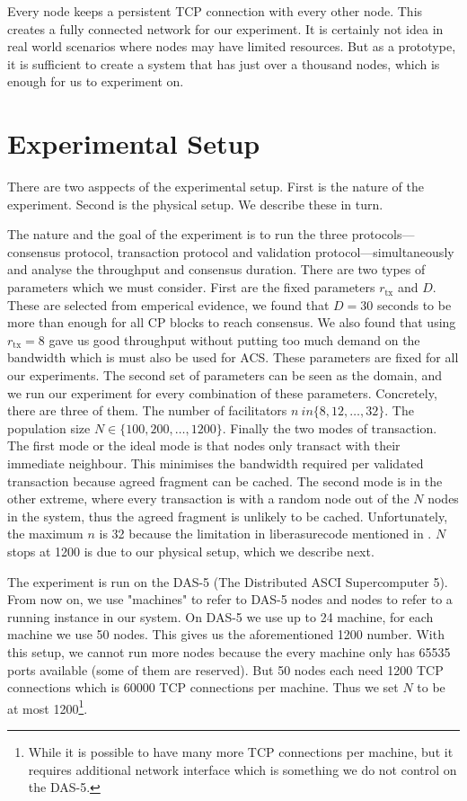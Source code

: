 Every node keeps a persistent TCP connection with every other node.
This creates a fully connected network for our experiment.
It is certainly not idea in real world scenarios where nodes may have limited resources.
But as a prototype, it is sufficient to create a system that has just over a thousand nodes, which is enough for us to experiment on.

\section{Experimental Setup}
\label{sec:experimental-setup}

There are two asppects of the experimental setup.
First is the nature of the experiment.
Second is the physical setup.
We describe these in turn.

The nature and the goal of the experiment is to run the three protocols---consensus protocol,
transaction protocol and validation protocol---simultaneously and analyse the throughput and consensus duration.
There are two types of parameters which we must consider.
First are the fixed parameters $r_{\text{tx}}$ and $D$.
These are selected from emperical evidence, we found that $D = 30$ seconds to be more than enough for all CP blocks to reach consensus.
We also found that using $r_{\text{tx}} = 8$ gave us good throughput without putting too much demand on the bandwidth which is must also be used for ACS.
These parameters are fixed for all our experiments.
The second set of parameters can be seen as the domain,
and we run our experiment for every combination of these parameters.
Concretely, there are three of them.
The number of facilitators $n \ in \{ 8, 12, \dots, 32\}$.
The population size $N \in \{100, 200, \dots, 1200\}$.
Finally the two modes of transaction.
The first mode or the ideal mode is that nodes only transact with their immediate neighbour. 
This minimises the bandwidth required per validated transaction because agreed fragment can be cached.
The second mode is in the other extreme, where  every transaction is with a random node out of the $N$ nodes in the system,
thus the agreed fragment is unlikely to be cached.
Unfortunately, the maximum $n$ is 32 because the limitation in liberasurecode mentioned in .
$N$ stops at 1200 is due to our physical setup, which we describe next.

The experiment is run on the DAS-5 (The Distributed ASCI Supercomputer 5).
From now on, we use "machines" to refer to DAS-5 nodes and nodes to refer to a running instance in our system.
On DAS-5 we use up to 24 machine, for each machine we use 50 nodes.
This gives us the aforementioned 1200 number.
With this setup, we cannot run more nodes because the every machine only has 65535 ports available (some of them are reserved).
But 50 nodes each need 1200 TCP connections which is 60000 TCP connections per machine.
Thus we set $N$ to be at most 1200\footnote{While it is possible to have many more TCP connections per machine,
but it requires additional network interface which is something we do not control on the DAS-5.}.

